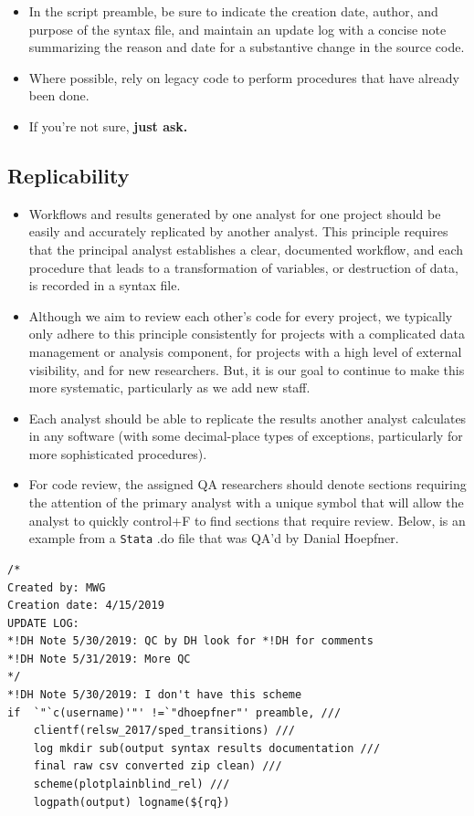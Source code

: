 \begin{itemize}
	\item In the script preamble, be sure to indicate the creation date, author, and purpose of the syntax file, and maintain an update log with a concise note summarizing the reason and date for a substantive change in the source code.
	\item Where possible, rely on legacy code to perform procedures that have already been done.
	\item If you're not sure, \bf{just ask}.
\end{itemize}

\subsection{Replicability}
\begin{itemize}
	\item Workflows and results generated by one analyst for one project should be easily and accurately replicated by another analyst. This principle requires that the principal analyst establishes a clear, documented workflow, and each procedure that leads to a transformation of variables, or destruction of data, is recorded in a syntax file.
	\item Although we aim to review each other's code for every project, we typically only adhere to this principle consistently for projects with a complicated data management or analysis component, for projects with a high level of external visibility, and for new researchers. But, it is our goal to continue to make this more systematic, particularly as we add new staff.
	\item Each analyst should be able to replicate the results another analyst calculates in any software (with some decimal-place types of exceptions, particularly for more sophisticated procedures).
	\item For code review, the assigned QA researchers should denote sections requiring the attention of the primary analyst with a unique symbol that will allow the analyst to quickly control+F to find sections that require review. Below, is an example from a \texttt{Stata} .do file that was QA'd by Danial Hoepfner.
\end{itemize}

\begin{lstlisting}
/*
Created by: MWG
Creation date: 4/15/2019
UPDATE LOG:
*!DH Note 5/30/2019: QC by DH look for *!DH for comments
*!DH Note 5/31/2019: More QC
*/
*!DH Note 5/30/2019: I don't have this scheme
if  `"`c(username)'"' !=`"dhoepfner"' preamble, ///
	clientf(relsw_2017/sped_transitions) ///
	log mkdir sub(output syntax results documentation ///
	final raw csv converted zip clean) ///
	scheme(plotplainblind_rel) ///
	logpath(output) logname(${rq})

\end{lstlisting}

